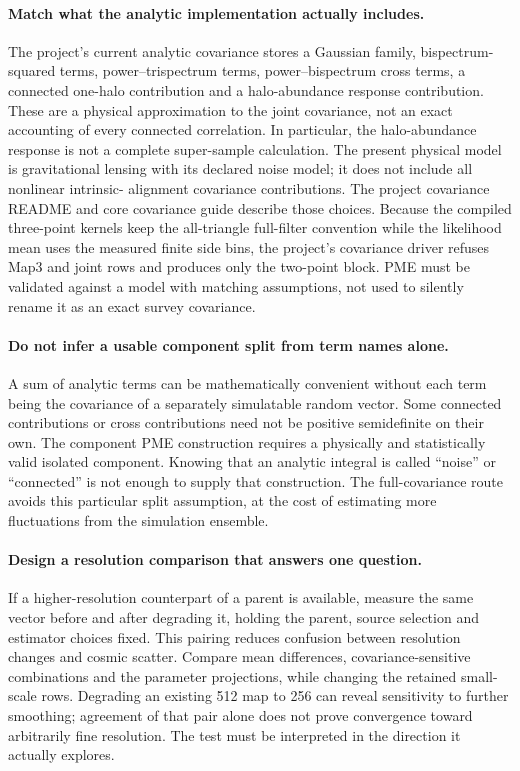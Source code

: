 \documentclass[11pt]{article}
\begin{document}
\paragraph{Match what the analytic implementation actually includes.}
The project's current analytic covariance stores a Gaussian family,
bispectrum-squared terms, power--trispectrum terms, power--bispectrum
cross terms, a connected one-halo contribution and a halo-abundance
response contribution. These are a physical approximation to the joint
covariance, not an exact accounting of every connected correlation. In
particular, the halo-abundance response is not a complete super-sample
calculation. The present physical model is gravitational lensing with
its declared noise model; it does not include all nonlinear intrinsic-
alignment covariance contributions. The project covariance README and
core covariance guide describe those choices. Because the compiled
three-point kernels keep the all-triangle full-filter convention while the
likelihood mean uses the measured finite side bins, the project's
covariance driver refuses Map3 and joint rows and produces only the
two-point block. PME must be validated against
a model with matching assumptions, not used to silently rename it as an
exact survey covariance.

\paragraph{Do not infer a usable component split from term names alone.}
A sum of analytic terms can be mathematically convenient without each
term being the covariance of a separately simulatable random vector.
Some connected contributions or cross contributions need not be positive
semidefinite on their own. The component PME construction requires a
physically and statistically valid isolated component. Knowing that an
analytic integral is called ``noise'' or ``connected'' is not enough to
supply that construction. The full-covariance route avoids this particular
split assumption, at the cost of estimating more fluctuations from the
simulation ensemble.

\paragraph{Design a resolution comparison that answers one question.}
If a higher-resolution counterpart of a parent is available, measure the
same vector before and after degrading it, holding the parent, source
selection and estimator choices fixed. This pairing reduces confusion
between resolution changes and cosmic scatter. Compare mean differences,
covariance-sensitive combinations and the parameter projections, while
changing the retained small-scale rows. Degrading an existing 512 map to
256 can reveal sensitivity to further smoothing; agreement of that pair
alone does not prove convergence toward arbitrarily fine resolution.
The test must be interpreted in the direction it actually explores.
\end{document}
